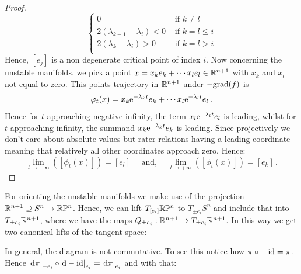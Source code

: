 \begin{example}
\begin{proof}
\begin{equation*}
				\begin{cases}
				0								&\text{ if }k\neq l \\
				2(\lambda_{k-1}-\lambda_i)<0	&\text{ if }k=l\leq i \\
				2(\lambda_k-\lambda_i)>0		&\text{ if } k=l > i\\
				\end{cases}
			\end{equation*} 
	 Hence, $[e_j]$ is a non degenerate critical point of index $i$. Now concerning the unstable manifolds, we pick a point $x=x_ke_k+\cdots x_le_l\in\mathbb{R}^{n+1}$ with $x_k$ and $x_l$ not equal to zero. This points trajectory in $\mathbb{R}^{n+1}$ under $-\mathrm{grad} (f)$ is
		\begin{equation*}
			\varphi_t(x)=x_k\mathrm{e}^{-\lambda_kt}e_k+\cdots x_l\mathrm{e}^{-\lambda_l t}e_l\,.
		\end{equation*} Hence for $t$ approaching negative infinity, the term $x_l\mathrm{e}^{-\lambda_l t}e_l$ is leading, whilst for $t$ approaching infinity, the summand $x_k\mathrm{e}^{-\lambda_kt}e_k$ is leading. Since projectively we don't care about absolute values but rater relations having a leading coordinate meaning that relatively all other coordinates approach zero. Hence:
		\begin{equation*}
			\lim_{t \to -\infty}([\phi_t(x)])=[e_l]\quad \text{ and, }\quad \lim_{t \to +\infty}([\phi_t(x)])=[e_k]\,.
		\end{equation*} 
			\end{proof}
			\begin{definition}[Orientations]
				For orienting the unstable manifolds we make use of the projection $\mathbb{R}^{n+1}\supseteq S^n\to \mathbb{R}\mathbb{P}^n$. Hence, we can lift $T_{[e_i]}\mathbb{R}\mathbb{P}^n $ to $T_{\pm e_i}S^n$ and include that into $T_{\pm e_i}\mathbb{R}^{n+1}$, where we have the maps $Q_{\pm e_i}:\mathbb{R}^{n+1}\to T_{\pm e_i}\mathbb{R}^{n+1}$. In this way we get two canonical lifts of the tangent space:
				\begin{center}
				\end{center}
				In general, the diagram is not commutative. To see this notice how $\pi\circ -\operatorname{\mathrm{id}}=\pi$. Hence $\left.\mathop{}\!\mathrm{d} \pi\right|_{-e_i} \circ \left.\mathop{}\!\mathrm{d} -\operatorname{\mathrm{id}}\right|_{e_i} =\left.\mathop{}\!\mathrm{d} \pi\right|_{e_i}$ and with that:  

\end{definition}
\end{example}
